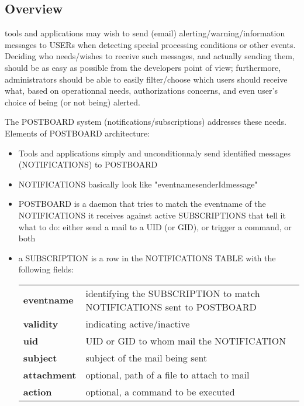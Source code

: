 \subsection{Overview}

\webobs tools and applications may wish to send (email) alerting/warning/information messages to \webobs USERs when detecting 
special processing conditions or other events. Deciding who needs/wishes to receive such messages, and actually sending them, should be
as easy as possible from the developers point of view; furthermore, \webobs administrators should be able to easily filter/choose which users 
should receive what, based on operationnal needs, authorizations concerns, and even user's choice of being (or not being) alerted.

The \webobs POSTBOARD system (notifications/subscriptions) addresses these needs. Elements of POSTBOARD architecture: 

\begin{itemize}
\item   Tools and applications simply and unconditionnaly send identified messages (NOTIFICATIONS) to POSTBOARD
\item   NOTIFICATIONS basically look like "eventname\textbar senderId\textbar message" 
\item   POSTBOARD is a daemon that tries to match the eventname of the NOTIFICATIONS it receives against active SUBSCRIPTIONS that 
tell it what to do: either send a mail to a UID (or GID), or trigger a command, or both
\item   a SUBSCRIPTION is a row in the \webobs NOTIFICATIONS TABLE with the following fields:

\begin{tabular}{ll}
\textbf{eventname} & identifying the SUBSCRIPTION to match NOTIFICATIONS sent to POSTBOARD\\ 
\textbf{validity}  & indicating active/inactive              \\  
\textbf{uid}       & UID or GID to whom mail the NOTIFICATION\\
\textbf{subject}   & subject of the mail being sent          \\  
\textbf{attachment}& optional, path of a file to attach to mail \\
\textbf{action}    & optional, a command to be executed      \\  
\end{tabular}
\end{itemize}

